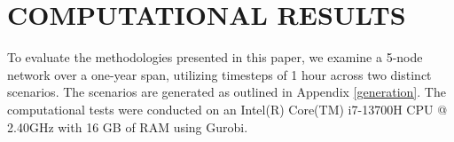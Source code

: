 \section{COMPUTATIONAL RESULTS}\label{section: comp res}






To evaluate the methodologies presented in this paper, we examine a  5-node network over a one-year span, utilizing timesteps of 1 hour across two distinct scenarios.
The scenarios are generated as outlined in Appendix  \ref{generation}. 
The computational tests were conducted on an Intel(R) Core(TM) i7-13700H CPU @ 2.40GHz with 16 GB of RAM using Gurobi.




